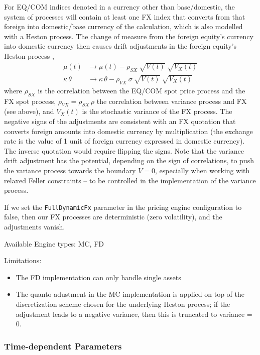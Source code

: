 For EQ/COM indices denoted in a currency other than base/domestic, the system of processes will
contain at least one FX index that converts from that foreign into domestic/base currency of the calculation,
which is also modelled with a Heston process. 
The change of measure from the foreign equity's currency into domestic currency then causes drift adjustments
in the foreign equity's Heston process \cite{cesarini_2014, stackexchange_40521},
\begin{align*}
  \mu(t) &\rightarrow \mu(t) - \rho_{SX}\:\sqrt{V(t)}\:\sqrt{V_X(t)} \\
  \kappa\,\theta &\rightarrow \kappa\,\theta - \rho_{VX}\: \sigma\:\sqrt{V(t)}\:\sqrt{V_X(t)} 
\end{align*}
where $\rho_{SX}$ is the correlation between the EQ/COM spot price process and the FX spot process,
$\rho_{VX} = \rho_{SX}\,\rho$ the correlation between variance process and FX (see above), and $V_X(t)$
is the stochastic variance of the FX process. The negative signs of the adjustments are consistent with
an FX quotation that converts foreign amounts into domestic currency by multiplication (the exchange rate
is the value of 1 unit of foreign currency expressed in domestic currency). The inverse quotation would require
flipping the signs. Note that the variance drift adjustment has the potential, depending on the sign of correlations,
to push the variance process towards the boundary $V=0$, especially when working with relaxed Feller constraints
-- to be controlled in the implementation of the variance process.

If we set the {\tt FullDynamicFx} parameter in the pricing engine configuration to false, then our FX processes
are deterministic (zero volatility), and the adjustments vanish.

\medskip
Available Engine types: MC, FD

\medskip
Limitations:
\begin{itemize}
\item The FD implementation can only handle single assets
\item The quanto adustment in the MC implementation is applied on top of the discretization scheme chosen for the
  underlying Heston process; if the adjustment leads to a negative variance, then this is truncated to variance = 0.
\end{itemize}

\subsubsection*{Time-dependent Parameters}

